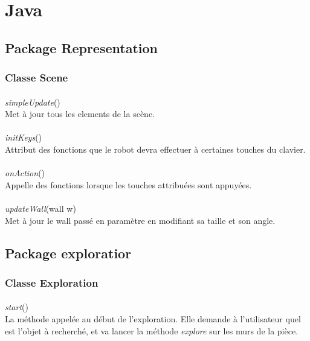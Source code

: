 \documentclass[12pt]{report}
\begin{document}
\section{Java}

\subsection{Package Representation}

\subsubsection{Classe Scene}

\paragraph{}
\textit{simpleUpdate}()\\
Met à jour tous les elements de la scène.

\paragraph{}
\textit{initKeys}()\\
Attribut des fonctions que le robot devra effectuer à certaines touches du clavier.

\paragraph{}
\textit{onAction}()\\
Appelle des fonctions lorsque les touches attribuées sont appuyées.

\paragraph{}
\textit{updateWall}(wall w)\\
Met à jour le wall passé en paramètre en modifiant sa taille et son angle.

\subsection{Package exploratior}

\subsubsection{Classe Exploration}

\paragraph{}
\textit{start}()\\
La méthode appelée au début de l'exploration. Elle demande à l'utilisateur quel est l'objet à recherché, et va lancer la méthode \textit{explore} sur les murs de la pièce.
\end{document}
